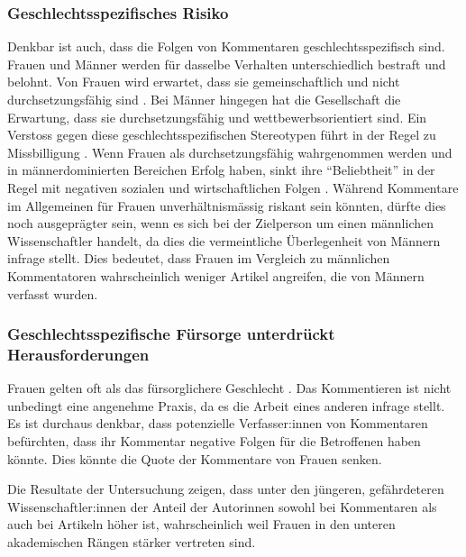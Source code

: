 \subsubsection{Geschlechtsspezifisches Risiko}
Denkbar ist auch, dass die Folgen von Kommentaren geschlechtsspezifisch sind.
Frauen und Männer werden für dasselbe Verhalten unterschiedlich bestraft und belohnt.
Von Frauen wird erwartet, dass sie gemeinschaftlich und nicht durchsetzungsfähig sind
\cite{burgess1999women,eagly2002role}. %
Bei Männer hingegen hat die Gesellschaft die Erwartung, dass sie durchsetzungsfähig und wettbewerbsorientiert sind.
Ein Verstoss gegen diese geschlechtsspezifischen Stereotypen führt in der Regel zu Missbilligung
\cite{self_promotion_risk_factor_for_women,mclaughlin2012sexual,mark_of_a_womans_record,rudman2008backlash}. %
Wenn Frauen als durchsetzungsfähig wahrgenommen werden und in männerdominierten Bereichen Erfolg haben, 
sinkt ihre \enquote{Beliebtheit} in der Regel mit negativen sozialen und wirtschaftlichen Folgen
\cite{self_promotion_risk_factor_for_women,mclaughlin2012sexual,mark_of_a_womans_record,rudman2008backlash}. %
Während Kommentare im Allgemeinen für Frauen unverhältnismässig riskant sein könnten, 
dürfte dies noch ausgeprägter sein, wenn es sich bei der Zielperson um einen männlichen Wissenschaftler handelt, 
da dies die vermeintliche Überlegenheit von Männern infrage stellt. 
Dies bedeutet, dass Frauen im Vergleich zu männlichen Kommentatoren wahrscheinlich weniger Artikel angreifen, 
die von Männern verfasst wurden.

\subsubsection{Geschlechtsspezifische Fürsorge unterdrückt Herausforderungen}
Frauen gelten oft als das fürsorglichere Geschlecht \cite{marsh2019caring}. %
Das Kommentieren ist nicht unbedingt eine angenehme Praxis, da es die Arbeit eines anderen infrage stellt. 
Es ist durchaus denkbar, dass potenzielle Verfasser:innen von Kommentaren befürchten, 
dass ihr Kommentar negative Folgen für die Betroffenen haben könnte.
Dies könnte die Quote der Kommentare von Frauen senken.

Die Resultate der Untersuchung zeigen, dass unter den jüngeren, gefährdeteren Wissenschaftler:innen der Anteil der Autorinnen 
sowohl bei Kommentaren als auch bei Artikeln höher ist, wahrscheinlich weil Frauen in den unteren akademischen Rängen stärker vertreten sind.

